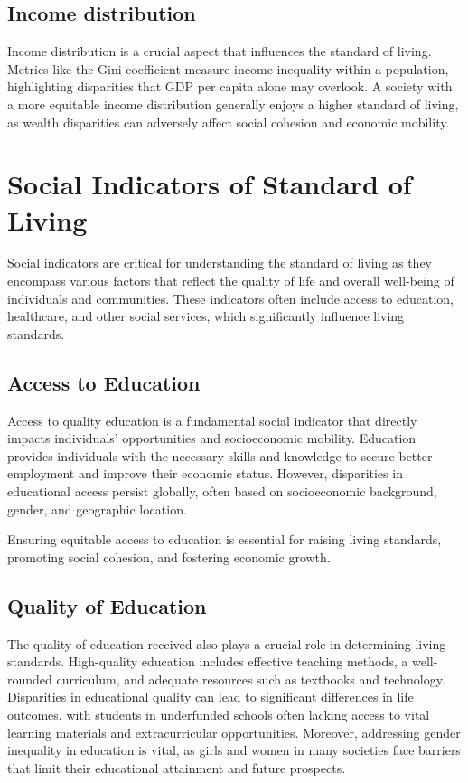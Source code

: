 \documentclass[12pt]{article}
\begin{document}
\subsection{Income distribution}
Income distribution is a crucial aspect that influences the standard of living. Metrics
like the Gini coefficient measure income inequality within a population, highlighting
disparities that GDP per capita alone may overlook. A society with a more equitable
income distribution generally enjoys a higher standard of living, as wealth disparities
can adversely affect social cohesion and economic mobility.

\section{Social Indicators of Standard of Living}
Social indicators are critical for understanding the standard of living as they encompass various factors that reflect the quality of life and overall well-being of individuals and communities. These indicators often include access to education, healthcare, and other social services, which significantly influence living standards.

\subsection{Access to Education}
Access to quality education is a fundamental social indicator that directly impacts individuals' opportunities and socioeconomic mobility. Education provides individuals with the necessary skills and knowledge to secure better employment and improve their economic status. However, disparities in educational access persist globally, often based on socioeconomic background, gender, and geographic location.

Ensuring equitable access to education is essential for raising living standards, promoting social cohesion, and fostering economic growth.

\subsection{Quality of Education}
The quality of education received also plays a crucial role in determining living standards.
High-quality education includes effective teaching methods, a well-rounded
curriculum, and adequate resources such as textbooks and technology. Disparities
in educational quality can lead to significant differences in life outcomes,
with students in underfunded schools often lacking access to vital learning materials
and extracurricular opportunities. Moreover, addressing gender inequality in
education is vital, as girls and women in many societies face barriers that limit their
educational attainment and future prospects.
\end{document}
